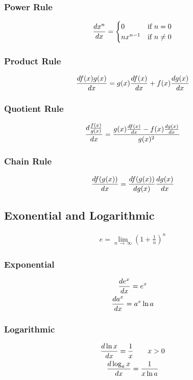 \documentclass[12pt]{article}
\numberwithin{equation}{subsubsection}
\begin{document}
			\subsubsection{Power Rule}
				\begin{gather}
					\derivative{x^n} =
						\begin{cases}
							0 & \text{if } n = 0 \\
							nx^{n-1} & \text{if } n
							\neq 0
						\end{cases}
				\end{gather}
			\subsubsection{Product Rule}
				\begin{gather}
					\derivative{f(x)g(x)} = g(x)\derivative{f(x)} +
					f(x)\derivative{g(x)}
				\end{gather}
			\subsubsection{Quotient Rule}
				\begin{gather}
					\derivative{\frac{f(x)}{g(x)}} =
					\frac{g(x)\derivative{f(x)} -
					f(x)\derivative{g(x)}}{g(x)^2}
				\end{gather}
			\subsubsection{Chain Rule}
				\begin{gather}
					\derivative{f(g(x))} =
					\derivative[g(x)]{f(g(x))}\derivative{g(x)}
				\end{gather}
		\subsection{Exonential and Logarithmic}
			\begin{gather}
				e = \lim_{n \,\to\, \infty} \left(1 +
				\frac{1}{n}\right)^n
			\end{gather}
			\subsubsection{Exponential}
				\begin{gather}
					\derivative{e^x} = e^x \\
					\derivative{a^x} = a^x\ln a
				\end{gather}
			\subsubsection{Logarithmic}
				\begin{gather}
					\derivative{\ln x} = \frac{1}{x} \qquad x > 0 \\
					\derivative{\log_ax} = \frac{1}{x\ln a}
				\end{gather}
\end{document}
